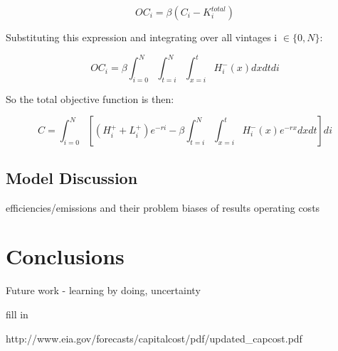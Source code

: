 \documentclass[singlespace]{easychithesis}
\begin{document}
\begin{equation}
OC_i = \beta (C_i - K^{total}_i)
\end{equation}


Substituting this expression and integrating over all vintages  i $\in \{0,N\}$:

\begin{equation}
OC_i = \beta \int_{i=0}^N \int_{t=i}^N \int_{x=i}^t H^-_i(x) dx dt di
\end{equation}

So the total objective function is then:

\begin{equation}
C = \int_{i=0}^N  \left[ (H^+_i + L^+_i)e^{-ri}  - \beta  \int_{t=i}^N \int_{x=i}^t H^-_i(x)e^{-rx} dx dt\right] di
\end{equation}





\section{Model Discussion}

efficiencies/emissions and their problem
biases of results
operating costs 




\chapter{Conclusions}

Future work - learning by doing, uncertainty




\singlespacing
\pagebreak
{}

\begin{thebibliography}{99}

fill in



http://www.eia.gov/forecasts/capitalcost/pdf/updated\_capcost.pdf





\end{thebibliography}
\end{document}
